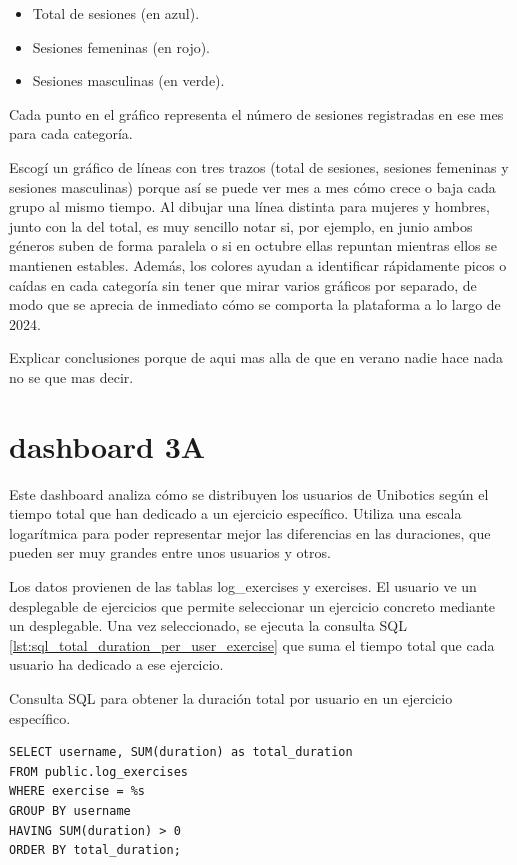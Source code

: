 \documentclass[a4paper, 12pt]{book}
\begin{document}
\begin{itemize}
  \item Total de sesiones (en azul).
  \item Sesiones femeninas (en rojo).
  \item Sesiones masculinas (en verde).
\end{itemize}


Cada punto en el gráfico representa el número de sesiones registradas en ese mes para cada categoría.

Escogí un gráfico de líneas con tres trazos (total de sesiones, sesiones femeninas y sesiones masculinas) porque así se puede ver mes a mes cómo crece o baja cada grupo al mismo tiempo. Al dibujar una línea distinta para mujeres y hombres, junto con la del total, es muy sencillo notar si, por ejemplo, en junio ambos géneros suben de forma paralela o si en octubre ellas repuntan mientras ellos se mantienen estables. Además, los colores ayudan a identificar rápidamente picos o caídas en cada categoría sin tener que mirar varios gráficos por separado, de modo que se aprecia de inmediato cómo se comporta la plataforma a lo largo de 2024.

Explicar conclusiones porque de aqui mas alla de que en verano nadie hace nada no se que mas decir.


\section{dashboard 3A}

Este dashboard analiza cómo se distribuyen los usuarios de Unibotics según el tiempo total que han dedicado a un ejercicio específico. Utiliza una escala logarítmica para poder representar mejor las diferencias en las duraciones, que pueden ser muy grandes entre unos usuarios y otros.

Los datos provienen de las tablas log\_exercises y exercises. El usuario ve un desplegable de ejercicios que permite seleccionar un ejercicio concreto mediante un desplegable. Una vez seleccionado, se ejecuta la consulta SQL \ref{lst:sql_total_duration_per_user_exercise} que suma el tiempo total que cada usuario ha dedicado a ese ejercicio.

\begin{listing}[h!]
    \caption{Consulta SQL para obtener la duración total por usuario en un ejercicio específico.}{}
    \label{lst:sql_total_duration_per_user_exercise}
    \begin{verbatim}
SELECT username, SUM(duration) as total_duration
FROM public.log_exercises
WHERE exercise = %s
GROUP BY username
HAVING SUM(duration) > 0
ORDER BY total_duration;
    \end{verbatim}
\end{listing}
\end{document}
